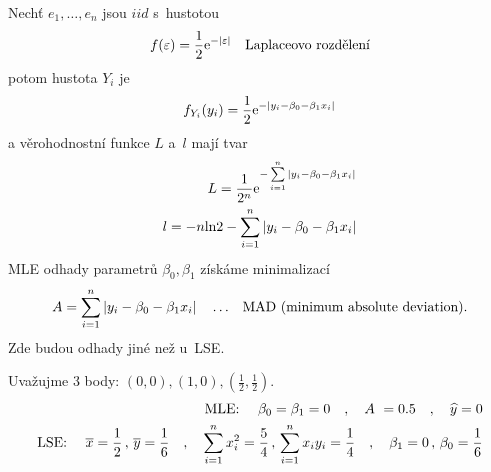 \begin{example}
Nechť $ e_{1}, \dots , e_{n} $ jsou $iid$ s~hustotou
\begin{equation*}
  f(\varepsilon) = \frac{1}{2} \mathrm{e}^{- \vert \varepsilon \vert} \quad \text{Laplaceovo rozdělení}
\end{equation*}
potom hustota $ Y_{i} $ je 
\begin{equation*}
  f_{Y_{i}}(y_{i}) = \frac{1}{2} \mathrm{e}^{- \vert y_{i} - \beta_{0} - \beta_{1} x_{i} \vert} 
\end{equation*}
a věrohodnostní funkce $ L $ a~$  l$ mají tvar
\begin{equation*}
\begin{aligned}
  L = \frac{1}{2^{n}} \mathrm{e}^{- \sum\limits_{i=1}^{n} \vert y_{i} - \beta_{0} - \beta_{1} x_{i} \vert}  \\
  l = -n \text{ln} 2 - \sum\limits_{i=1}^{n} \vert y_{i} - \beta_{0} - \beta_{1} x_{i} \vert 
\end{aligned} 
\end{equation*}
MLE odhady parametrů $ \beta_{0} , \beta_{1} $ získáme minimalizací
$$
A = \sum\limits_{i=1}^{n} \vert y_{i} - \beta_{0} - \beta_{1} x_{i} \vert \quad \dots \text{ \, MAD (minimum absolute deviation).}
$$
Zde budou odhady jiné než u~LSE.

Uvažujme 3 body: $ (0,0) , (1,0) , (\frac{1}{2},\frac{1}{2}) $.
$$
\begin{aligned}
\text{MLE: } \quad  \beta_{0} = \beta_{1} = 0 \quad , \quad A~= 0.5
 \quad , \quad \widehat{y} = 0 \\
 \text{LSE: } \quad \overline{x} = \frac{1}{2} \, , \, \overline{y} = \frac{1}{6} \quad , \quad \sum\limits_{i=1}^{n} x_{i}^{2} = \frac{5}{4} \, , \, \sum\limits_{i=1}^{n} x_{i} y_{i} = \frac{1}{4} \quad , \quad \beta_{1} = 0 \, , \, \beta_{0} = \frac{1}{6}
  \end{aligned}  
$$
\end{example}

\begin{center}
    
\end{center}

